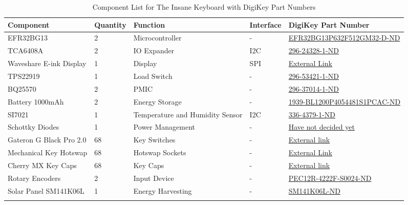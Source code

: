 \documentclass[a4paper,11pt]{article}%
\begin{document}
\begin{longtable}{|p{2cm}|p{1.5cm}|p{3cm}|p{1.5cm}|p{6cm}|}
    \hline
    \textbf{Component} & \textbf{Quantity} & \textbf{Function} & \textbf{Interface} & \textbf{DigiKey Part Number} \\
    \hline
    EFR32BG13 & 2 & Microcontroller & - & 
    \href{https://www.digikey.com/en/products/detail/silicon-labs/EFR32BG13P632F512GM32-D/10135852}{EFR32BG13P632F512GM32-D-ND} \\
    \hline
    TCA6408A & 2 & IO Expander & I2C  & 
    \href{https://www.digikey.com/en/products/detail/texas-instruments/TCA6408ARSVR/2044045}{296-24328-1-ND} \\
    \hline
    Waveshare E-ink Display & 1 & Display & SPI  & 
    \href{https://www.waveshare.com/1.54inch-e-paper-module.htm}{External Link} \\
    \hline
    TPS22919 & 1 & Load Switch & -  & 
    \href{https://www.digikey.com/en/products/detail/texas-instruments/TPS22919DCKT/9953066}{296-53421-1-ND} \\
    \hline
    BQ25570 & 2 & PMIC & - & 
    \href{https://www.digikey.com/en/products/detail/texas-instruments/BQ25570RGRT/4430487}{296-37014-1-ND} \\
    \hline
    Battery 1000mAh & 2 & Energy Storage & -  & 
    \href{https://www.digikey.com/en/products/detail/globtek-inc/BL1200P4054481S1PCAC/11201333}{1939-BL1200P4054481S1PCAC-ND} \\
    \hline
    SI7021 & 1 & Temperature and Humidity Sensor & I2C  & 
    \href{https://www.digikey.com/en/products/detail/silicon-labs/SI7021-A20-GMR/5048936}{336-4379-1-ND} \\
    \hline
    Schottky Diodes & 1 & Power Management & -  & 
    \href{-}{Have not decided yet} \\
    \hline
    Gateron G Black Pro 2.0 & 68 & Key Switches & - & 
    \href{https://www.gateron.co/products/gateron-g-pro-2-0-switch-set}{External link} \\
    \hline
    Mechanical Key Hotswap & 68 & Hotswap Sockets & - & 
    \href{https://www.gateron.co/products/gateron-hot-swap-pcb-socket}{External Link} \\
    \hline
    Cherry MX Key Caps & 68 & Key Caps & - & 
    \href{https://www.aliexpress.com/i/3256802573932641.html?gatewayAdapt=4itemAdapt}{External link} \\
    \hline
    Rotary Encoders & 2 & Input Device & - & 
    \href{https://www.digikey.com/en/products/detail/bourns-inc/PEC12R-4222F-S0024/4699283}{PEC12R-4222F-S0024-ND} \\
    \hline
    Solar Panel SM141K06L & 1 & Energy Harvesting & - & 
    \href{https://www.digikey.com/en/products/detail/anysolar-ltd/SM141K06L/9990462}{SM141K06L-ND} \\
    \hline
    \caption{Component List for The Insane Keyboard with DigiKey Part Numbers}
    \label{tab:components}
\end{longtable}
\end{document}

